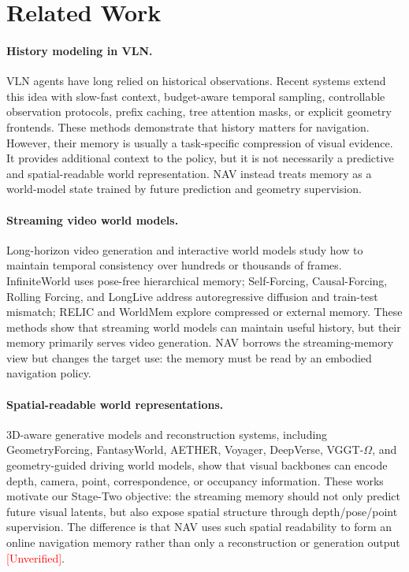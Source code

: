 \documentclass[11pt,a4paper]{ctexart}
\newcommand{\method}{NAV}
\newcommand{\unverified}{\textcolor{red}{[Unverified]}}
\begin{document}
\section{Related Work}

\paragraph{History modeling in VLN.}
VLN agents have long relied on historical observations. Recent systems extend this idea with slow-fast context, budget-aware temporal sampling, controllable observation protocols, prefix caching, tree attention masks, or explicit geometry frontends. These methods demonstrate that history matters for navigation. However, their memory is usually a task-specific compression of visual evidence. It provides additional context to the policy, but it is not necessarily a predictive and spatial-readable world representation. \method{} instead treats memory as a world-model state trained by future prediction and geometry supervision.

\paragraph{Streaming video world models.}
Long-horizon video generation and interactive world models study how to maintain temporal consistency over hundreds or thousands of frames. InfiniteWorld uses pose-free hierarchical memory; Self-Forcing, Causal-Forcing, Rolling Forcing, and LongLive address autoregressive diffusion and train-test mismatch; RELIC and WorldMem explore compressed or external memory. These methods show that streaming world models can maintain useful history, but their memory primarily serves video generation. \method{} borrows the streaming-memory view but changes the target use: the memory must be read by an embodied navigation policy.

\paragraph{Spatial-readable world representations.}
3D-aware generative models and reconstruction systems, including GeometryForcing, FantasyWorld, AETHER, Voyager, DeepVerse, VGGT-\(\Omega\), and geometry-guided driving world models, show that visual backbones can encode depth, camera, point, correspondence, or occupancy information. These works motivate our Stage-Two objective: the streaming memory should not only predict future visual latents, but also expose spatial structure through depth/pose/point supervision. The difference is that \method{} uses such spatial readability to form an online navigation memory rather than only a reconstruction or generation output \unverified{}.
\end{document}
